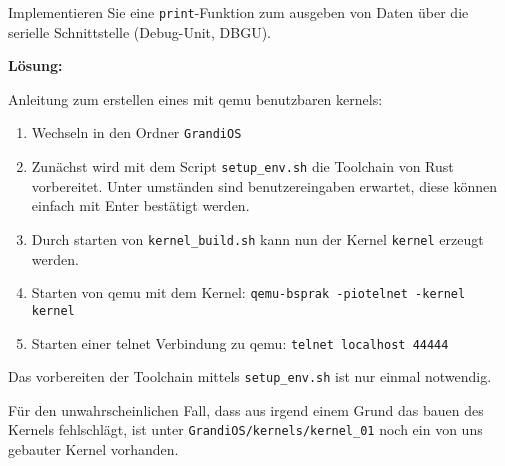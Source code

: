 \begin{description}

Implementieren Sie eine \texttt{print}-Funktion zum ausgeben von Daten über die serielle Schnittstelle (Debug-Unit, DBGU).

\textbf{Lösung:}

Anleitung zum erstellen eines mit qemu benutzbaren kernels:
\begin{enumerate}
	\item Wechseln in den Ordner \texttt{GrandiOS}
	\item Zunächst wird mit dem Script \texttt{setup\_env.sh} die Toolchain von Rust vorbereitet. Unter umständen sind benutzereingaben erwartet, diese können einfach mit Enter bestätigt werden.
	\item Durch starten von \texttt{kernel\_build.sh} kann nun der Kernel \texttt{kernel} erzeugt werden.
	\item Starten von qemu mit dem Kernel: \texttt{qemu-bsprak -piotelnet -kernel kernel}
	\item Starten einer telnet Verbindung zu qemu: \texttt{telnet localhost 44444}
\end{enumerate}
Das vorbereiten der Toolchain mittels \texttt{setup\_env.sh} ist nur einmal notwendig.

Für den unwahrscheinlichen Fall, dass aus irgend einem Grund das bauen des Kernels fehlschlägt, ist unter \texttt{GrandiOS/kernels/kernel\_01} noch ein von uns gebauter Kernel vorhanden.

\end{description}

